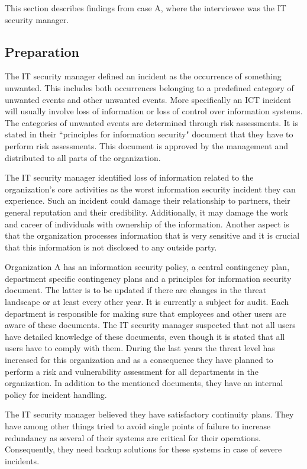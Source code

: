 This section describes findings from case A, where the interviewee was the IT security manager.

\subsection{Preparation}
The IT security manager defined an incident as the occurrence of something unwanted. This includes both occurrences belonging to a predefined category of unwanted events and other unwanted events. More specifically an \ac{ICT} incident will usually involve loss of information or loss of control over information systems. The categories of unwanted events are determined through risk assessments. It is stated in their ``principles for information security" document that they have to perform risk assessments. This document is approved by the management and distributed to all parts of the organization. 

The IT security manager identified loss of information related to the organization's core activities as the worst information security incident they can experience. Such an incident could damage their relationship to partners, their general reputation and their credibility. Additionally, it may damage the work and career of individuals with ownership of the information. Another aspect is that the organization processes information that is very sensitive and it is crucial that this information is not disclosed to any outside party. 

Organization A has an information security policy, a central contingency plan, department specific contingency plans and a principles for information security document. The latter is to be updated if there are changes in the threat landscape or at least every other year. It is currently a subject for audit. Each department is responsible for making sure that employees and other users are aware of these documents. The IT security manager suspected that not all users have detailed knowledge of these documents, even though it is stated that all users have to comply with them. During the last years the threat level has increased for this organization and as a consequence they have planned to perform a risk and vulnerability assessment for all departments in the organization. In addition to the mentioned documents, they have an internal policy for incident handling.

The IT security manager believed they have satisfactory continuity plans. They have among other things tried to avoid single points of failure to increase redundancy as several of their systems are critical for their operations. Consequently, they need backup solutions for these systems in case of severe incidents. 

